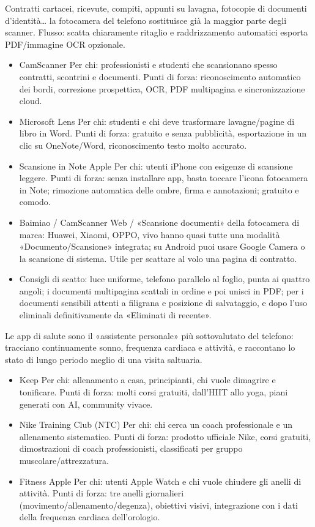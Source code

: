Contratti cartacei, ricevute, compiti, appunti su lavagna, fotocopie di documenti d'identità… la fotocamera del telefono sostituisce già la maggior parte degli scanner. Flusso: scatta chiaramente ritaglio e raddrizzamento automatici esporta PDF/immagine OCR opzionale.

\begin{itemize}
  \item CamScanner Per chi: professionisti e studenti che scansionano spesso contratti, scontrini e documenti. Punti di forza: riconoscimento automatico dei bordi, correzione prospettica, OCR, PDF multipagina e sincronizzazione cloud.
  \item Microsoft Lens Per chi: studenti e chi deve trasformare lavagne/pagine di libro in Word. Punti di forza: gratuito e senza pubblicità, esportazione in un clic su OneNote/Word, riconoscimento testo molto accurato.
  \item Scansione in Note Apple Per chi: utenti iPhone con esigenze di scansione leggere. Punti di forza: senza installare app, basta toccare l'icona fotocamera in Note; rimozione automatica delle ombre, firma e annotazioni; gratuito e comodo.
  \item Baimiao / CamScanner Web / «Scansione documenti» della fotocamera di marca: Huawei, Xiaomi, OPPO, vivo hanno quasi tutte una modalità «Documento/Scansione» integrata; su Android puoi usare Google Camera o la scansione di sistema. Utile per scattare al volo una pagina di contratto.
  \item Consigli di scatto: luce uniforme, telefono parallelo al foglio, punta ai quattro angoli; i documenti multipagina scattali in ordine e poi unisci in PDF; per i documenti sensibili attenti a filigrana e posizione di salvataggio, e dopo l'uso eliminali definitivamente da «Eliminati di recente».
\end{itemize}


Le app di salute sono il «assistente personale» più sottovalutato del telefono: tracciano continuamente sonno, frequenza cardiaca e attività, e raccontano lo stato di lungo periodo meglio di una visita saltuaria.


\begin{itemize}
  \item Keep Per chi: allenamento a casa, principianti, chi vuole dimagrire e tonificare. Punti di forza: molti corsi gratuiti, dall'HIIT allo yoga, piani generati con AI, community vivace.
  \item Nike Training Club (NTC) Per chi: chi cerca un coach professionale e un allenamento sistematico. Punti di forza: prodotto ufficiale Nike, corsi gratuiti, dimostrazioni di coach professionisti, classificati per gruppo muscolare/attrezzatura.
  \item Fitness Apple Per chi: utenti Apple Watch e chi vuole chiudere gli anelli di attività. Punti di forza: tre anelli giornalieri (movimento/allenamento/degenza), obiettivi visivi, integrazione con i dati della frequenza cardiaca dell'orologio.
\end{itemize}

